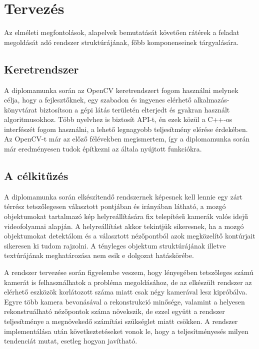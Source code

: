 \chapter{Tervezés}

Az elméleti megfontolások, alapelvek bemutatását követően rátérek a feladat megoldását adó rendszer struktúrájának, főbb komponenseinek tárgyalására.

\section{Keretrendszer}

A diplomamunka során az OpenCV \cite{opencv} keretrendszert fogom használni melynek célja, hogy a fejlesztőknek, egy szabadon és ingyenes elérhető alkalmazás-könyvtárat biztosítson a gépi látás területén elterjedt és gyakran használt algoritmusokhoz. Több nyelvhez is biztosít API-t, én ezek közül a C++-os interfészét fogom használni, a lehető legnagyobb teljesítmény elérése érdekében. Az OpenCV-t már az előző félévekben megismertem, így a diplomamunka során már eredményesen tudok építkezni az általa nyújtott funkciókra.

\section{A célkitűzés}

A diplomamunka során elkészítendő rendszernek képesnek kell lennie egy zárt térrész tetszőlegesen választott pontjában és irányában látható, a mozgó objektumokat tartalmazó kép helyreállítására fix telepítésű kamerák valós idejű videofolyamai alapján. A helyreállítást akkor tekintjük sikeresnek, ha a mozgó objektumokat detektálom és a választott nézőpontból azok megközelítő kontúrjait sikeresen ki tudom rajzolni. A tényleges objektum struktúrájának illetve textúrájának meghatározása nem esik e dolgozat hatáskörébe.

A rendszer tervezése során figyelembe veszem, hogy lényegében tetszőleges számú kamerát is felhasználhatok a probléma megoldásához, de az elkészült rendszer az elérhető eszközök korlátozott száma miatt csak négy kamerával lesz kipróbálva. Egyre több kamera bevonásával a rekonstrukció minősége, valamint a helyesen rekonstruálható nézőpontok száma növekszik, de ezzel együtt a rendszer teljesítménye a megnövekedő számítási szükséglet miatt csökken. A rendszer implementálása után következtetéseket vonok le, hogy a teljesítményesés milyen tendenciát mutat, esetleg hogyan javítható. %

